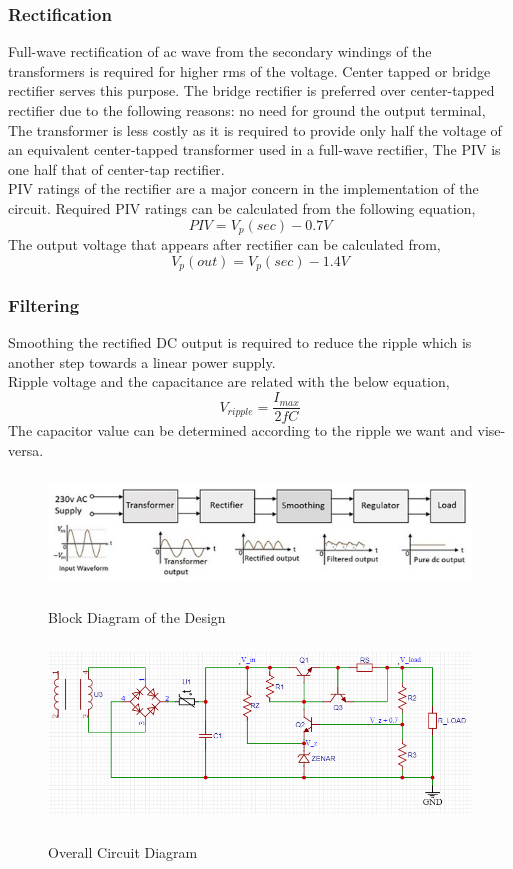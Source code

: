 \documentclass[11pt]{article}
\begin{document}
\begin{multicols}{2}
\subsubsection{Rectification}
Full-wave rectification of ac wave from the secondary windings of the transformers is required for higher rms of the voltage. Center tapped or bridge rectifier serves this purpose. The bridge rectifier is preferred over center-tapped rectifier due to the following reasons: no need for ground the output terminal, The transformer is less costly as it is required to provide only half the voltage of an equivalent center-tapped transformer used in a full-wave rectifier, The PIV is one half that of center-tap rectifier.\\
PIV ratings of the rectifier are a major concern in the implementation of the circuit. Required PIV ratings can be calculated from the following equation,\\
$$PIV = V_p(sec) - 0.7V$$
The output voltage that appears after rectifier can be calculated from,\\
$$V_p(out) = V_p(sec) - 1.4V$$
\subsubsection{Filtering}
Smoothing the rectified DC output is required to reduce the ripple which is another step towards a linear power supply.\\
Ripple voltage and the capacitance are related with the below equation,
$$V_{ripple} = \frac{I_{max}}{2fC}$$
The capacitor value can be determined according to the ripple we want and vise-versa.\\
\end{multicols}
\newpage
\begin{figure}[H]
   \centering
   \includegraphics[height=1.2in]{Block_Diagram.jpeg}\\
   \caption{Block Diagram of the Design}
\end{figure}
\begin{figure}[H]
   \centering
   \includegraphics[height=1.9in]{Full circuit.png}\\
   \caption{Overall Circuit Diagram}
\end{figure}
\end{document}
